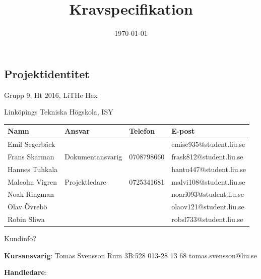 \documentclass[a4paper,titlepage,12pt]{article}
\title{\textbf{Kravspecifikation}}
\date{\today}
\begin{document}
	\maketitle
	\newpage

	
	\begin{center}


		\section*{Projektidentitet}
		Grupp 9, Ht 2016, LiTHe Hex

		Linköpings Tekniska Högskola, ISY

		\begin{table}[h]
			\begin{tabular}[pos]{| l | l | l | l |}
				\hline
				\textbf{Namn} & \textbf{Ansvar} & \textbf{Telefon} & \textbf{E-post} \\ \hline
				Emil Segerbäck & & & emise935@student.liu.se \\ \hline
				Frans Skarman & Dokumentansvarig & 0708798660 & frask812@student.liu.se \\ \hline
				Hannes Tuhkala & & & hantu447@student.liu.se \\ \hline
				Malcolm Vigren & Projektledare & 0725341681 & malvi108@student.liu.se \\ \hline
				Noak Ringman &  &  & noari093@student.liu.se \\ \hline
				Olav Övrebö &  &  & olaov121@student.liu.se \\ \hline
				Robin Sliwa &  &  & robsl733@student.liu.se \\ \hline
			\end{tabular}
		\end{table}


		Kundinfo?

		\textbf{Kursansvarig}: Tomas Svensson Rum 3B:528 013-28 13 68 tomas.svensson@liu.se

		\textbf{Handledare}:


		
		\newpage




\end{center}
\end{document}
